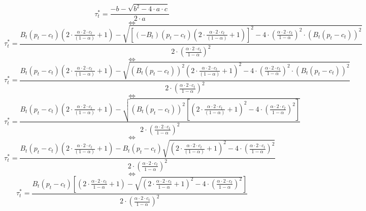 \documentclass{article}
\begin{document}
\begin{equation*}
    \tau_{t}^{*}=\frac{-b-\sqrt{b^2-4\cdot a\cdot c}}{2\cdot a}
\end{equation*}
$$\iff$$
\begin{equation*}
    \tau_{t}^{*}=\frac{B_{t}\left(p_{t}-c_{t}\right)\left(2\cdot \frac{\alpha \cdot 2\cdot c_{t}}{(1-\alpha)}+1\right)-\sqrt{\left[\left(-B_{t}\right)\left(p_{t}-c_{t}\right)\left(2\cdot \frac{\alpha \cdot 2\cdot c_{t}}{(1-\alpha)}+1\right)\right]^2-4\cdot \left(\frac{\alpha \cdot 2\cdot c_{t}}{1-\alpha}\right)^{2}\cdot \left(B_{t}(p_{t}-c_{t})\right)^{2}}}{2\cdot \left(\frac{\alpha \cdot 2\cdot c_{t}}{1-\alpha}\right)^{2}}
\end{equation*}
$$\iff$$
\begin{equation*}
    \tau_{t}^{*}=\frac{B_{t}\left(p_{t}-c_{t}\right)\left(2\cdot \frac{\alpha \cdot 2\cdot c_{t}}{(1-\alpha)}+1\right)-\sqrt{\left(B_{t}\left(p_{t}-c_{t}\right)\right)^{2}\left(2\cdot \frac{\alpha \cdot 2\cdot c_{t}}{(1-\alpha)}+1\right)^2-4\cdot \left(\frac{\alpha \cdot 2\cdot c_{t}}{1-\alpha}\right)^{2}\cdot \left(B_{t}(p_{t}-c_{t})\right)^{2}}}{2\cdot \left(\frac{\alpha \cdot 2\cdot c_{t}}{1-\alpha}\right)^{2}}
\end{equation*}
$$\iff$$
\begin{equation*}
    \tau_{t}^{*}=\frac{B_{t}\left(p_{t}-c_{t}\right)\left(2\cdot \frac{\alpha \cdot 2\cdot c_{t}}{(1-\alpha)}+1\right)-\sqrt{\left(B_{t}\left(p_{t}-c_{t}\right)\right)^{2}\left[\left(2\cdot \frac{\alpha \cdot 2\cdot c_{t}}{(1-\alpha)}+1\right)^2-4\cdot \left(\frac{\alpha \cdot 2\cdot c_{t}}{1-\alpha}\right)^{2}\right]}}{2\cdot \left(\frac{\alpha \cdot 2\cdot c_{t}}{1-\alpha}\right)^{2}}
\end{equation*}
$$\iff$$
\begin{equation*}
    \tau_{t}^{*}=\frac{B_{t}\left(p_{t}-c_{t}\right)\left(2\cdot \frac{\alpha \cdot 2\cdot c_{t}}{(1-\alpha)}+1\right)-B_{t}\left(p_{t}-c_{t}\right)\sqrt{\left(2\cdot \frac{\alpha \cdot 2\cdot c_{t}}{(1-\alpha)}+1\right)^2-4\cdot \left(\frac{\alpha \cdot 2\cdot c_{t}}{1-\alpha}\right)^{2}}}{2\cdot \left(\frac{\alpha \cdot 2\cdot c_{t}}{1-\alpha}\right)^{2}}
\end{equation*}
$$\iff$$
\begin{equation*}
    \tau_{t}^{*}=\frac{B_{t}\left(p_{t}-c_{t}\right)\left[\left(2\cdot \frac{\alpha \cdot 2\cdot c_{t}}{1-\alpha}+1\right)-\sqrt{\left(2\cdot \frac{\alpha \cdot 2\cdot c_{t}}{1-\alpha}+1\right)^2-4\cdot \left(\frac{\alpha \cdot 2\cdot c_{t}}{1-\alpha}\right)^{2}}\right]}{2\cdot \left(\frac{\alpha \cdot 2\cdot c_{t}}{1-\alpha}\right)^{2}}
\end{equation*}
\end{document}
